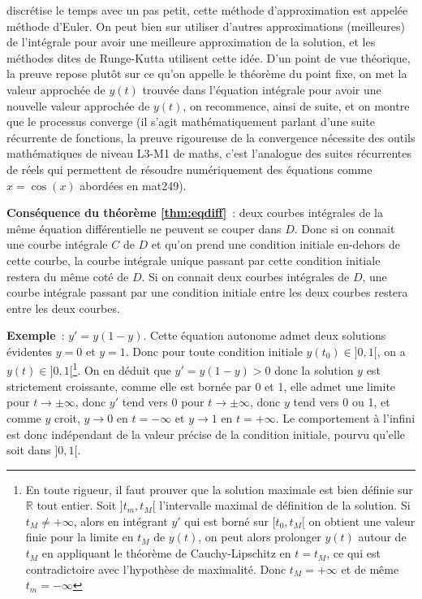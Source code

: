 \documentclass[a4paper,11pt]{article}
\newcommand{\R}{{\mathbb{R}}}
\begin{document}
\begin{giacjshere}
discr\'etise le temps avec un pas petit, cette m\'ethode
d'approximation est appel\'ee m\'ethode d'Euler. On peut
bien sur utiliser d'autres approximations (meilleures) de
l'int\'egrale pour avoir une meilleure approximation de la solution,
et les m\'ethodes dites de Runge-Kutta utilisent cette id\'ee. D'un
point de vue th\'eorique, la preuve repose plut\^ot sur ce qu'on
appelle le th\'eor\`eme du point fixe, on met la valeur approch\'ee
de $y(t)$ trouv\'ee dans l'\'equation int\'egrale pour avoir
une nouvelle valeur approch\'ee de $y(t)$, on recommence,
ainsi de suite, et on montre que
le processus converge (il s'agit math\'ematiquement parlant
d'une suite r\'ecurrente de fonctions, la preuve rigoureuse
de la convergence n\'ecessite des outils math\'ematiques 
de niveau L3-M1 de maths, c'est l'analogue des suites
r\'ecurrentes de r\'eels qui permettent de r\'esoudre
num\'eriquement des \'equations comme $x=\cos(x)$
abord\'ees en mat249).

{\bf Cons\'equence du th\'eor\`eme \ref{thm:eqdiff}}~: 
deux courbes int\'egrales de la m\^eme \'equation
diff\'erentielle ne peuvent se couper dans $D$. Donc si on connait
une courbe int\'egrale $C$ de $D$ et qu'on prend une condition initiale
en-dehors de cette courbe, la courbe int\'egrale unique passant
par cette condition initiale restera du m\^eme cot\'e de $D$. Si on
connait deux courbes int\'egrales de $D$, une courbe int\'egrale
passant par une condition initiale entre les deux courbes restera
entre les deux courbes.

{\bf Exemple}~: $y'=y(1-y)$. Cette \'equation autonome admet deux solutions
\'evidentes $y=0$ et $y=1$. Donc pour toute condition initiale $y(t_0)
\in ]0,1[$, on a $y(t) \in ]0,1[$\footnote{En toute rigueur,
il faut prouver que la solution maximale est bien d\'efinie sur
$\R$ tout entier. Soit $]t_m,t_M[$ l'intervalle maximal de
d\'efinition de la solution. Si $t_M \neq +\infty$,
alors en int\'egrant $y'$ qui est born\'e sur $[t_0,t_M[$ 
on obtient une valeur finie pour la limite en $t_M$ de $y(t)$,
on peut alors prolonger $y(t)$ autour de $t_M$
en appliquant le th\'eor\`eme de Cauchy-Lipschitz en $t=t_M$,
ce qui est contradictoire avec l'hypoth\`ese de maximalit\'e. 
Donc $t_M=+\infty$ et de m\^eme $t_m=-\infty$}. 
On en d\'eduit que $y'=y(1-y)>0$
donc la solution $y$ est strictement croissante, comme elle est
born\'ee par 0 et 1, elle admet une limite pour $t \rightarrow \pm
\infty$, donc $y'$ tend vers 0 pour $t \rightarrow \pm
\infty$, donc $y$ tend vers 0 ou 1, et comme $y$ croit, 
$y \rightarrow 0$ en $t=-\infty$ et $y \rightarrow 1$ en $t=+\infty$.
Le comportement \`a l'infini est donc ind\'ependant de la valeur
pr\'ecise de la condition initiale, pourvu qu'elle soit dans $]0,1[$.


\end{giacjshere}
\end{document}
